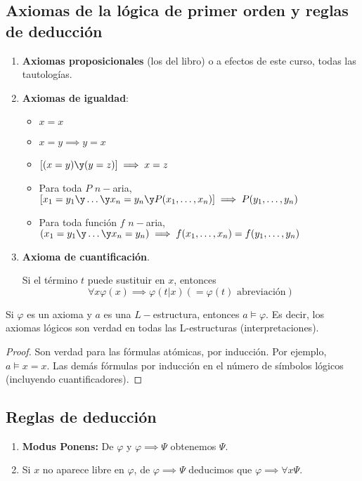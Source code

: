 \subsection{Axiomas de la lógica de primer orden y reglas de deducción}

\begin{enumerate}
	\item \textbf{Axiomas proposicionales} (los del libro) o a efectos de este curso, todas las tautologías.
	\item \textbf{Axiomas de igualdad}:
	\begin{itemize}
		\item $x=x$
		\item $x=y \implies y=x$
		\item $\left[(x=y)\y(y=z)\right]\implies x=z$
		\item Para toda $P$ $n-$aria, $\left[x_1=y_1\y \hdots\y x_n=y_n \y P(x_1, \hdots, x_n)\right] \implies P(y_1, \hdots, y_n)$
		\item Para toda función $f$ $n-$aria, $(x_1=y_1\y \hdots \y x_n=y_n)\implies f(x_1, \hdots, x_n) = f(y_1, \hdots, y_n)$
	\end{itemize}
	\item \textbf{Axioma de cuantificación}.
	
	Si el término $t$ puede sustituir en $x$, entonces
	$$\forall x\varphi(x) \implies \varphi (t|x) (= \varphi(t) \text{ abreviación})$$
\end{enumerate}

\begin{theorem}
	Si $\varphi$ es un axioma y $a$ es una $L-$estructura, entonces $a\vDash \varphi$.
	Es decir, los axiomas lógicos son verdad en todas las L-estructuras (interpretaciones).
\end{theorem}
\begin{proof}
	Son verdad para las fórmulas atómicas, por inducción.
	Por ejemplo, $a\vDash x=x$. Las demás fórmulas por inducción en el número de símbolos lógicos (incluyendo cuantificadores).
\end{proof}

\subsection{Reglas de deducción}
\begin{enumerate}
	\item \textbf{Modus Ponens:} De $\varphi$ y $\varphi\implies \Psi$ obtenemos $\Psi$.
	\item Si $x$ no aparece libre en $\varphi$, de $\varphi \implies \Psi$ deducimos que $\varphi\implies \forall x \Psi$.
\end{enumerate}

